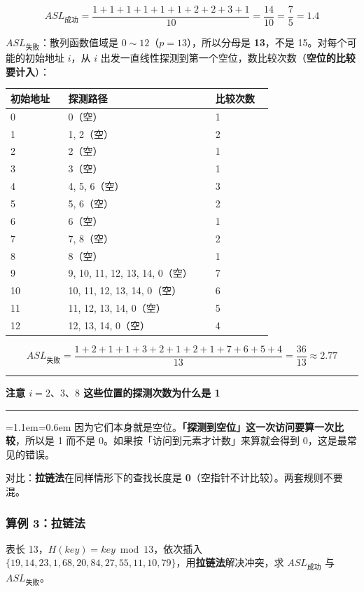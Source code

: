 \documentclass[11pt,openany,UTF8]{ctexbook}
\newcommand{\callouthead}[2]{%
  \par\addvspace{7pt}\noindent
  {\color{#1}\rule[-0.15em]{3pt}{1.05em}}\hspace{0.5em}%
  {\bfseries\color{#1}#2}\par\nobreak\vspace{-0.35em}%
  {\color{rulesep}\hrule height 0.4pt}\nobreak\vspace{0.45em}%
  \begingroup\small\setlength{\parindent}{0pt}%
  \leftskip=1.1em\rightskip=0.6em\noindent\ignorespaces}
\newcommand{\calloutend}{\par\endgroup\addvspace{7pt}}
\newenvironment{callwarn}[1]{\callouthead{warnbar}{#1}}{\calloutend}
\begin{document}
\[ASL_{成功}=\frac{1+1+1+1+1+1+2+2+3+1}{10}=\frac{14}{10}=\frac{7}{5}=1.4\]

\textbf{$ASL_{失败}$}：散列函数值域是 $0\sim 12$（$p=13$），所以分母是 \textbf{13}，不是 15。对每个可能的初始地址 $i$，从 $i$ 出发一直线性探测到第一个空位，数比较次数（\textbf{空位的比较要计入}）：

\begingroup\small\setlength{\tabcolsep}{4.0pt}
\begin{longtable}{@{}L{0.2090\linewidth}L{0.5105\linewidth}L{0.2090\linewidth}@{}}
\toprule
\textbf{初始地址} & \textbf{探测路径} & \textbf{比较次数} \\
\midrule
{} & 0（空） & 1 \\
1 & 1, 2（空） & 2 \\
2 & 2（空） & 1 \\
3 & 3（空） & 1 \\
4 & 4, 5, 6（空） & 3 \\
5 & 5, 6（空） & 2 \\
6 & 6（空） & 1 \\
7 & 7, 8（空） & 2 \\
8 & 8（空） & 1 \\
9 & 9, 10, 11, 12, 13, 14, 0（空） & 7 \\
10 & 10, 11, 12, 13, 14, 0（空） & 6 \\
11 & 11, 12, 13, 14, 0（空） & 5 \\
12 & 12, 13, 14, 0（空） & 4 \\
\bottomrule
\end{longtable}
\endgroup

\[ASL_{失败}=\frac{1+2+1+1+3+2+1+2+1+7+6+5+4}{13}=\frac{36}{13}\approx2.77\]

\begin{callwarn}{注意 $i=2、3、8$ 这些位置的探测次数为什么是 1}
因为它们本身就是空位。\textbf{「探测到空位」这一次访问要算一次比较}，所以是 1 而不是 0。如果按「访问到元素才计数」来算就会得到 0，这是最常见的错误。

对比：\textbf{拉链法}在同样情形下的查找长度是 \textbf{0}（空指针不计比较）。两套规则不要混。

\end{callwarn}

\subsubsection{算例 3：拉链法}

表长 13，$H(key)=key\bmod 13$，依次插入 $\{19,14,23,1,68,20,84,27,55,11,10,79\}$，用\textbf{拉链法}解决冲突，求 $ASL_{成功}$ 与 $ASL_{失败}$。
\end{document}
